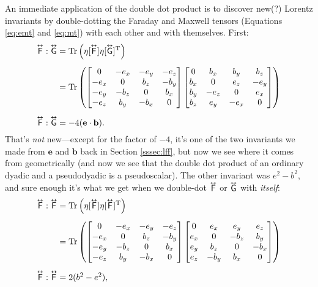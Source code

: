 \documentclass[12pt]{article}
\renewcommand{\vv}[1]{\mathbf{#1}}
\newcommand{\tightoverset}[2]{%
  \mathop{#2}\limits^{\vbox to -.5ex{\kern-0.75ex\hbox{$#1$}\vss}}}
\newcommand{\inlinedy}[1]{\tightoverset{\text{\tiny$\bm\leftrightarrow$}}{#1}}
\newcommand{\capdy}[1]{ \overset{ \text{\tiny$\bm\leftrightarrow$} }{\vphantom{\text{\small{A}}}\smash{#1}} }
\begin{document}
An immediate application of the double dot product is to discover new(?) Lorentz invariants by double-dotting the Faraday and Maxwell tensors (Equations \ref{eq:emt} and \ref{eq:mt}) with each other and with themselves. First:
\begin{equation}\label{eq:fddg}
\begin{split}
\capdy{\mathsf{F}} : \capdy{\mathsf{G}} &= \mathrm{Tr} \left( \eta [ \capdy{\mathsf{F}} ] \eta [ \capdy{\mathsf{G}} ]^{\mathrm{T}} \right) \\[5pt]
&=
\mathrm{Tr}
\left(
\begin{bmatrix}
0 & -e_x & -e_y & -e_z \\
-e_x & 0 & b_z & -b_y \\
-e_y & -b_z & 0 & b_x \\
-e_z & b_y & -b_x & 0
\end{bmatrix}
\begin{bmatrix}
0 & b_x & b_y & b_z \\
b_x & 0 & e_z & -e_y \\
b_y & -e_z & 0 & e_x \\
b_z & e_y & -e_x & 0
\end{bmatrix}
\right) \\[5pt]
\capdy{\mathsf{F}} : \capdy{\mathsf{G}} &= -4 (\vv e \cdot \vv b).
\end{split}
\end{equation}
That's \emph{not} new---except for the factor of $-4$, it's one of the two invariants we made from $\vv e$ and $\vv b$ back in Section \ref{sssec:lff}, but now we see where it comes from geometrically (and now we see that the double dot product of an ordinary dyadic and a pseudodyadic is a pseudoscalar). The other invariant was $e^2 - b^2$, and sure enough it's what we get when we double-dot $\inlinedy{\mathsf{F}}$ or $\inlinedy{\mathsf{G}}$ with \emph{itself}:
\begin{equation}\label{eq:fddf}
\begin{split}
\capdy{\mathsf{F}} : \capdy{\mathsf{F}} &= \mathrm{Tr} \left( \eta [ \capdy{\mathsf{F}} ] \eta [ \capdy{\mathsf{F}} ]^{\mathrm{T}} \right) \\[5pt]
&=
\mathrm{Tr}
\left(
\begin{bmatrix}
0 & -e_x & -e_y & -e_z \\
-e_x & 0 & b_z & -b_y \\
-e_y & -b_z & 0 & b_x \\
-e_z & b_y & -b_x & 0
\end{bmatrix}
\begin{bmatrix}
0 & e_x & e_y & e_z \\
e_x & 0 & -b_z & b_y \\
e_y & b_z & 0 & -b_x \\
e_z & -b_y & b_x & 0
\end{bmatrix}
\right) \\[5pt]
\capdy{\mathsf{F}} : \capdy{\mathsf{F}} &= 2(b^2 - e^2),
\end{split}
\end{equation}
\end{document}
